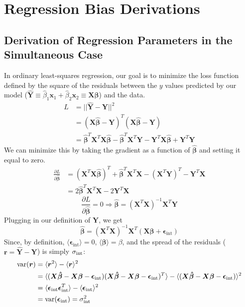 \chapter{Regression Bias Derivations}
\section{Derivation of Regression Parameters in the Simultaneous Case}
\label{app:simultaneous_ols}
In ordinary least-squares regression, our goal is to minimize the loss function defined by the square of the residuals between the $y$ values predicted by our model ($\hat{\bm{Y}}\equiv\hat{\beta}_1\bm{x}_1 +\hat{\beta}_2\bm{x}_2\equiv\bm{X\hat{\beta}}$) and the data. 
\begin{align*}
    L &= ||\hat{\bm{Y}}-\bm{Y}||^2\\
    &= (\bm{X\hat{\beta}}-\bm{Y})^T(\bm{X\hat{\beta}}-\bm{Y})\\
    &= \bm{\hat{\beta}}^T\bm{X}^T\bm{X\hat{\beta}}
    - \bm{\hat{\beta}}^T\bm{X}^T\bm{Y}
    - \bm{Y}^T\bm{X\hat{\beta}}
    + \bm{Y}^T\bm{Y}
\end{align*}
We can minimize this by taking the gradient as a function of $\bm{\hat{\beta}}$ and setting it equal to zero.
\begin{align*}
    \frac{\partial L}{\partial\bm{\hat{\beta}}} &=
    (\bm{X}^T\bm{X}\bm{\hat{\beta}})^T
    + \bm{\hat{\beta}}^T\bm{X}^T\bm{X}
    - (\bm{X}^T\bm{Y})^T
    - \bm{Y}^T\bm{X}\\
    &= 2\bm{\hat{\beta}}^T\bm{X}^T\bm{X} - 2\bm{Y}^T\bm{X}
\end{align*}
$$\frac{\partial L}{\partial\bm{\hat{\beta}}} = 0 \Rightarrow \bm{\hat{\beta}}=(\bm{X}^T\bm{X})^{-1}\bm{X}^T\bm{Y}$$
Plugging in our definition of $\bm{Y}$, we get
\begin{equation}
    \bm{\hat{\beta}} = (\bm{X}^T\bm{X})^{-1}\bm{X}^T(\bm{X\beta} + \bm{\epsilon}_\text{int})
\label{eqn:sim_beta_vec_app}
\end{equation}
Since, by definition, $\langle\bm{\epsilon}_\text{int}\rangle=0$, $\langle\bm{\hat{\beta}}\rangle = \beta$, and the spread of the residuals ($\bm{r}=\bm{\hat{Y}}-\bm{Y}$) is simply $\sigma_{\text{int}}$:
\begin{align*}
    \text{var}(\bm{r}) &= \langle\bm{r}^2\rangle - \langle\bm{r}\rangle^2\\
    &= \langle(\bm{X\hat{\beta}}-\bm{X\beta}-\bm{\epsilon}_\text{int})(\bm{X\hat{\beta}}-\bm{X\beta}-\bm{\epsilon}_\text{int})^T\rangle - \langle(\bm{X\hat{\beta}}-\bm{X\beta}-\bm{\epsilon}_\text{int})\rangle^2\\
    &= \langle\bm{\epsilon}_\text{int}\bm{\epsilon}_\text{int}^T\rangle - \langle\bm{\epsilon}_\text{int}\rangle^2\\
    &= \text{var}(\bm{\epsilon}_\text{int}) = \sigma_{\text{int}}^2
\end{align*}


